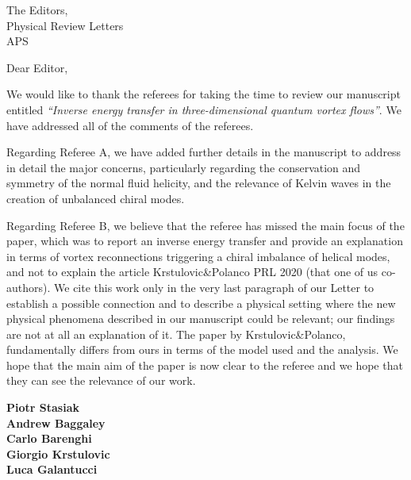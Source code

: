 \documentclass[a4paper,10pt]{letter}
\begin{document}


The Editors,\\
Physical Review Letters\\
APS\\


\vspace{1cm}

Dear Editor,

\vspace{0.5cm}

We would like to thank the referees for taking the time to review our manuscript entitled \emph{``Inverse energy transfer in three-dimensional quantum vortex flows''}. We have addressed all of the comments of the referees. 

Regarding Referee A, we have added further details in the manuscript to address in detail the major concerns, particularly regarding the conservation and symmetry of the normal fluid helicity, and the relevance of Kelvin waves in the creation of unbalanced chiral modes. 

Regarding Referee B, we believe that the referee has missed the main focus of the paper, which was to report an inverse energy transfer and provide an explanation in terms of vortex reconnections triggering a chiral imbalance of helical modes, and not to explain the article Krstulovic\&Polanco PRL 2020 (that one of us
co-authors). We cite this work only in the very last paragraph of our Letter to establish a possible connection and to describe a physical setting where the new physical phenomena described in our manuscript could be relevant; our findings are not at all an explanation of it. The paper by Krstulovic\&Polanco, fundamentally differs from ours in terms of the model used and the analysis. We hope that the main aim of the paper is now clear to the referee and we hope that they can see the relevance of our work.

\vspace{1cm}

\textbf{Piotr Stasiak}\\
\textbf{Andrew Baggaley}\\
\textbf{Carlo Barenghi}\\
\textbf{Giorgio Krstulovic}\\
\textbf{Luca Galantucci}\\
\end{document}
